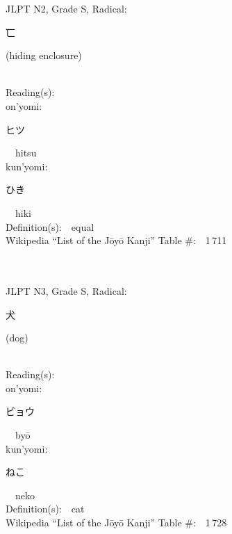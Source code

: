 \begin{multicols}{2}
{JLPT N2, Grade S, Radical:\ \ {\begin{CJK}{UTF8}{min} 匸 \end{CJK}} (hiding enclosure) } \\
Reading(s):\ \ \\
{\hspace*{1em}}on'yomi:\ \ \\
{\hspace*{2em}}{\begin{CJK}{UTF8}{min} ヒツ \end{CJK}}\ \ hitsu\ \ \\
{\hspace*{1em}}kun'yomi:\ \ \\
{\hspace*{2em}}{\begin{CJK}{UTF8}{min} ひき \end{CJK}}\ \ hiki\ \ \\
Definition(s):\ \ equal \\
Wikipedia ``List of the J\=oy\=o Kanji'' Table \#:\ \ 1\,711 \\
\ \ \\
{\fontsize{34pt}{40pt}  }\ \ \\  %
{JLPT N3, Grade S, Radical:\ \ {\begin{CJK}{UTF8}{min} 犬 \end{CJK}} (dog) } \\
Reading(s):\ \ \\
{\hspace*{1em}}on'yomi:\ \ \\
{\hspace*{2em}}{\begin{CJK}{UTF8}{min} ビョウ \end{CJK}}\ \ by\=o\ \ \\
{\hspace*{1em}}kun'yomi:\ \ \\
{\hspace*{2em}}{\begin{CJK}{UTF8}{min} ねこ \end{CJK}}\ \ neko\ \ \\
Definition(s):\ \ cat \\
Wikipedia ``List of the J\=oy\=o Kanji'' Table \#:\ \ 1\,728 \\
\ \ \\
{\fontsize{34pt}{40pt}  }\ \ \\  %

\end{multicols}
